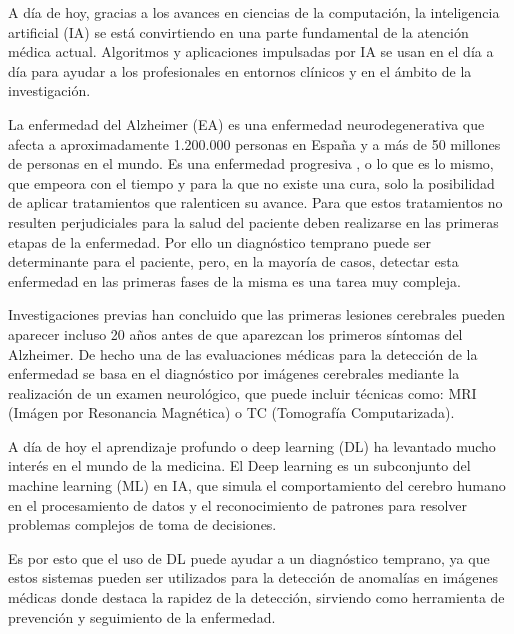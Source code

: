 

A día de hoy, gracias a los avances en ciencias de la computación, la inteligencia artificial (IA) se está convirtiendo
en una parte fundamental de la atención médica actual.
Algoritmos y aplicaciones impulsadas por IA se usan en el día a día para ayudar a los profesionales en entornos clínicos
y en el ámbito de la investigación.

La enfermedad del Alzheimer (EA)  es una enfermedad neurodegenerativa que afecta a aproximadamente 1.200.000 personas
en España y a más de 50 millones de personas en el mundo.
 Es una enfermedad progresiva , o lo que es lo mismo, que empeora con el tiempo y para la que no existe una cura, solo
la posibilidad de aplicar tratamientos que ralenticen su avance.
Para que estos tratamientos no resulten perjudiciales para la salud del paciente deben realizarse en las primeras etapas
de la enfermedad.
Por ello un diagnóstico temprano puede ser determinante para el paciente, pero, en la mayoría de casos, detectar esta
enfermedad en las primeras fases de la misma es una tarea muy compleja.

Investigaciones previas han concluido que las primeras lesiones cerebrales pueden aparecer incluso 20 años antes de que
aparezcan los primeros síntomas del Alzheimer.
De hecho una de las evaluaciones médicas para la detección de la enfermedad se basa en el diagnóstico por imágenes
cerebrales mediante la realización de un examen neurológico, que puede incluir técnicas como: MRI
(Imágen por Resonancia Magnética) o TC (Tomografía Computarizada).

A día de hoy el aprendizaje profundo o deep learning (DL)  ha levantado mucho interés en el mundo de la medicina.
El Deep learning es un subconjunto del machine learning (ML) en IA, que simula el comportamiento del cerebro humano en
el procesamiento de datos y el reconocimiento de patrones para resolver problemas complejos de toma de decisiones.

Es por esto que el uso de DL puede ayudar a un diagnóstico temprano, ya que estos sistemas pueden ser utilizados para la
detección de anomalías en imágenes médicas donde destaca la rapidez de la detección, sirviendo como herramienta de
prevención y seguimiento de la enfermedad.

